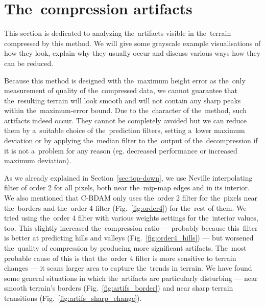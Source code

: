 \section{The~compression artifacts}\label{sec:artifs}

This section is dedicated to analyzing the~artifacts visible in the~terrain compressed by this method. We will give some grayscale example visualisations of how they look, explain why they usually occur and discuss various ways how they can be reduced.

Because this method is designed with the~maximum height error as the~only measurement of quality of the~compressed data, we cannot guarantee that the~resulting terrain will look smooth and will not contain any sharp peaks within the~maximum-error bound. Due to the~character of the~method, such artifacts indeed occur. They cannot be completely avoided but we can reduce them by a~suitable choice of the~prediction filters, setting a~lower maximum deviation or by applying the~median filter to the~output of the~decompression if it is not a~problem for any reason (eg. decreased performance or increased maximum deviation).

As we already explained in Section~\ref{sec:top-down}, we use Neville interpolating filter of order 2 for all pixels, both near the~mip-map edges and in its interior. We also mentioned that C-BDAM only uses the~order 2 filter for the~pixels near the~borders and the~order 4 filter (Fig.~\ref{fig:order4}) for the~rest of them. We tried using the~order 4 filter with various weights settings for the~interior values, too. This slightly increased the~compression ratio --- probably because this~filter is better at predicting hills and valleys (Fig.~\ref{fig:order4_hills}) --- but worsened the~quality of compression by producing more significant artifacts. The~most probable cause of this is that the~order 4 filter is more sensitive to terrain changes --- it scans larger area to capture the~trends in terrain. We have found some general situations in which the~artifacts are particularly disturbing --- near smooth terrain's borders (Fig.~\ref{fig:artifs_border}) and near sharp terrain transitions (Fig.~\ref{fig:artifs_sharp_change}). 

\newcommand{\vcentered}[1]{\begingroup\setbox0=\hbox{#1}\parbox{\wd0}{\box0}\endgroup}

\newcommand{\artifWidth}{160}
\newcommand{\artifHeight}{120}
\newcommand{\incimg}[3]{\texttt{[image: \#3]}}
\newcommand{\incimgvcenter}[3]{\vcentered{\incimg{#1}{#2}{#3}}}
\newcommand{\incartifborder}[1]{\incimgvcenter{\artifWidth}{\artifHeight}{#1}}
\newcommand{\hspacehead}{\hspace{0.4cm}}

